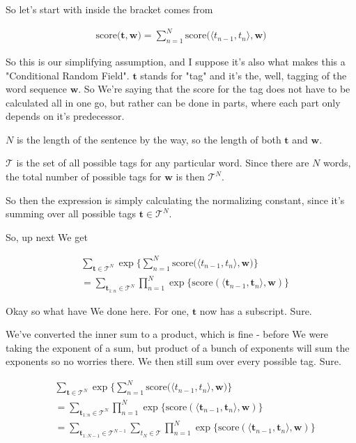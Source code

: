 \documentclass{article}
\begin{document}
	So let's start with inside the bracket comes from
	
	\begin{align}
		\text{score}\big(\mathbf{t}, \mathbf{w} \big) = \sum^N_{n=1} \text{score}\big( \langle t_{n-1}, t_n \rangle, \mathbf{w} \big)
	\end{align}
	
	So this is our simplifying assumption, and I suppose it's also what makes this a "Conditional Random Field". $\mathbf{t}$ stands for "tag" and it's the, well, tagging of the word sequence $\mathbf{w}$. So We're saying that the score for  the tag does not have to be calculated all in one go, but rather can be done in parts, where each part only depends on it's predecessor. 
	
	$N$ is the length of the sentence by the way, so the length of both $\mathbf{t}$ and $\mathbf{w}$. 
	
	$\mathcal{T}$ is the set of all possible tags for any particular word. Since there are $N$ words, the total number of possible tags for $\mathbf{w}$ is then $\mathcal{T}^N$.
	
	So then the expression is simply calculating the normalizing constant, since it's summing over all possible tags $\mathbf{t}\in\mathcal{T}^N$.
	
	So, up next We get
	
	\begin{align}
		&\sum_{\mathbf{t}\in\mathcal{T}^N} \exp\bigg\{ \sum^N_{n=1} \text{score}\big( \langle t_{n-1}, t_n \rangle, \mathbf{w} \big) \bigg\}\\
		&= \sum_{\mathbf{t}_{1:n}\in\mathcal{T}^N} \prod^N_{n=1} \exp \big\{ \text{score}(\langle \mathbf{t}_{n-1}, \mathbf{t}_n \rangle, \mathbf{w}) \big\}
	\end{align}	
	
	Okay so what have We done here. For one, $\mathbf{t}$ now has a subscript. Sure.
	
	We've converted the inner sum to a product, which is fine - before We were taking the exponent of a sum, but product of a bunch of exponents will sum the exponents so no worries there. We then still sum over every possible tag. Sure. 
	
	\begin{align}
		&\sum_{\mathbf{t}\in\mathcal{T}^N} \exp\bigg\{ \sum^N_{n=1} \text{score}\big( \langle t_{n-1}, t_n \rangle, \mathbf{w} \big) \bigg\}\\
		&= \sum_{\mathbf{t}_{1:n}\in\mathcal{T}^N} \prod^N_{n=1} \exp \big\{ \text{score}(\langle \mathbf{t}_{n-1}, \mathbf{t}_n \rangle, \mathbf{w}) \big\}\\
		&= \sum_{\mathbf{t}_{1:N-1}\in\mathcal{T}^{N-1}} \sum_{t_N\in \mathcal{T}} \prod^N_{n=1} \exp \big\{ \text{score}(\langle \mathbf{t}_{n-1}, \mathbf{t}_n \rangle, \mathbf{w}) \big\}
	\end{align}	
	
\end{document}
